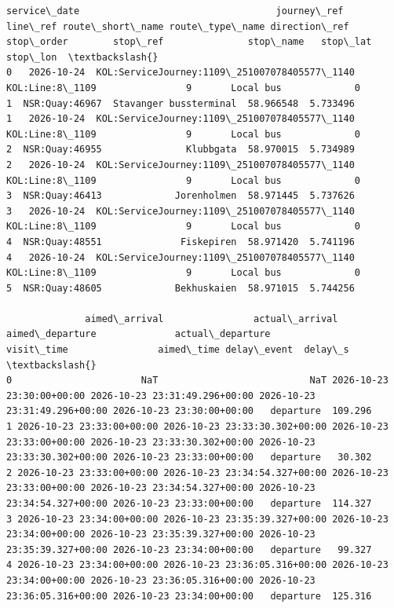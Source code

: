 \documentclass[11pt]{article}
\begin{document}
    
    \begin{Verbatim}[commandchars=\\\{\}]
  service\_date                                   journey\_ref         line\_ref route\_short\_name route\_type\_name direction\_ref  stop\_order        stop\_ref               stop\_name   stop\_lat  stop\_lon  \textbackslash{}
0   2026-10-24  KOL:ServiceJourney:1109\_251007078405577\_1140  KOL:Line:8\_1109                9       Local bus             0           1  NSR:Quay:46967  Stavanger bussterminal  58.966548  5.733496   
1   2026-10-24  KOL:ServiceJourney:1109\_251007078405577\_1140  KOL:Line:8\_1109                9       Local bus             0           2  NSR:Quay:46955               Klubbgata  58.970015  5.734989   
2   2026-10-24  KOL:ServiceJourney:1109\_251007078405577\_1140  KOL:Line:8\_1109                9       Local bus             0           3  NSR:Quay:46413             Jorenholmen  58.971445  5.737626   
3   2026-10-24  KOL:ServiceJourney:1109\_251007078405577\_1140  KOL:Line:8\_1109                9       Local bus             0           4  NSR:Quay:48551              Fiskepiren  58.971420  5.741196   
4   2026-10-24  KOL:ServiceJourney:1109\_251007078405577\_1140  KOL:Line:8\_1109                9       Local bus             0           5  NSR:Quay:48605             Bekhuskaien  58.971015  5.744256   

              aimed\_arrival                actual\_arrival           aimed\_departure              actual\_departure                    visit\_time                aimed\_time delay\_event  delay\_s  \textbackslash{}
0                       NaT                           NaT 2026-10-23 23:30:00+00:00 2026-10-23 23:31:49.296+00:00 2026-10-23 23:31:49.296+00:00 2026-10-23 23:30:00+00:00   departure  109.296   
1 2026-10-23 23:33:00+00:00 2026-10-23 23:33:30.302+00:00 2026-10-23 23:33:00+00:00 2026-10-23 23:33:30.302+00:00 2026-10-23 23:33:30.302+00:00 2026-10-23 23:33:00+00:00   departure   30.302   
2 2026-10-23 23:33:00+00:00 2026-10-23 23:34:54.327+00:00 2026-10-23 23:33:00+00:00 2026-10-23 23:34:54.327+00:00 2026-10-23 23:34:54.327+00:00 2026-10-23 23:33:00+00:00   departure  114.327   
3 2026-10-23 23:34:00+00:00 2026-10-23 23:35:39.327+00:00 2026-10-23 23:34:00+00:00 2026-10-23 23:35:39.327+00:00 2026-10-23 23:35:39.327+00:00 2026-10-23 23:34:00+00:00   departure   99.327   
4 2026-10-23 23:34:00+00:00 2026-10-23 23:36:05.316+00:00 2026-10-23 23:34:00+00:00 2026-10-23 23:36:05.316+00:00 2026-10-23 23:36:05.316+00:00 2026-10-23 23:34:00+00:00   departure  125.316   


\end{Verbatim}
\end{document}
